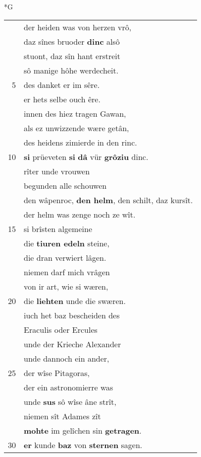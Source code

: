 \documentclass[8pt,a4paper,notitlepage]{article}
\begin{document}
\newpage
\begin{table}[ht]
\begin{minipage}[t]{0.5\linewidth}
\small
\begin{center}*G
\end{center}
\begin{tabular}{rl}
 & der heiden was von herzen vrô,\\ 
 & daz sînes bruoder \textbf{dinc} alsô\\ 
 & stuont, daz sîn hant erstreit\\ 
 & sô manige hôhe werdecheit.\\ 
5 & des danket er im sêre.\\ 
 & er hets selbe ouch êre.\\ 
 & innen des hiez tragen Gawan,\\ 
 & als ez unwizzende wære getân,\\ 
 & des heidens zimierde in den rinc.\\ 
10 & \textbf{si} prüeveten \textbf{si} \textbf{dâ} vür \textbf{grôziu} dinc.\\ 
 & rîter unde vrouwen\\ 
 & begunden alle schouwen\\ 
 & den wâpenroc, \textbf{den helm}, den schilt, daz kursît.\\ 
 & der helm was zenge noch ze wît.\\ 
15 & si brîsten algemeine\\ 
 & die \textbf{tiuren edeln} steine,\\ 
 & die dran verwiert lâgen.\\ 
 & niemen darf mich vrâgen\\ 
 & von ir art, wie si wæren,\\ 
20 & die \textbf{liehten} unde die swæren.\\ 
 & iuch het baz bescheiden des\\ 
 & Eraculis oder Ercules\\ 
 & unde der Krieche Alexander\\ 
 & unde dannoch ein ander,\\ 
25 & der wîse Pitagoras,\\ 
 & der ein astronomierre was\\ 
 & unde \textbf{sus} sô wîse âne strît,\\ 
 & niemen sît Adames zît\\ 
 & \textbf{mohte} im gelîchen sin \textbf{getragen}.\\ 
30 & \textbf{er} kunde \textbf{baz} von \textbf{sternen} sagen.\\ 

\end{tabular}
\end{minipage}
\end{table}
\end{document}
